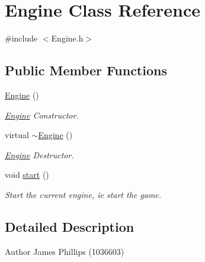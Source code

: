 \hypertarget{class_engine}{}\section{Engine Class Reference}
\label{class_engine}


{\ttfamily \#include $<$Engine.\+h$>$}

\subsection*{Public Member Functions}
\begin{DoxyCompactItemize}
\item 
\mbox{\label{class_engine_a8c98683b0a3aa28d8ab72a8bcd0d52f2}} 
\hyperlink{class_engine_a8c98683b0a3aa28d8ab72a8bcd0d52f2}{Engine} ()
\begin{DoxyCompactList}\small\item\em \hyperlink{class_engine}{Engine} Constructor. \end{DoxyCompactList}\item 
\mbox{\label{class_engine_a8ef7030a089ecb30bbfcb9e43094717a}} 
virtual \hyperlink{class_engine_a8ef7030a089ecb30bbfcb9e43094717a}{$\sim$\+Engine} ()
\begin{DoxyCompactList}\small\item\em \hyperlink{class_engine}{Engine} Destructor. \end{DoxyCompactList}\item 
\mbox{\label{class_engine_a4d8066dd213a03f5420d1bf60f150ca7}} 
void \hyperlink{class_engine_a4d8066dd213a03f5420d1bf60f150ca7}{start} ()
\begin{DoxyCompactList}\small\item\em Start the current engine, ie start the game. \end{DoxyCompactList}\end{DoxyCompactItemize}


\subsection{Detailed Description}
\begin{DoxyAuthor}{Author}
James Phillips (1036603) 
\end{DoxyAuthor}


